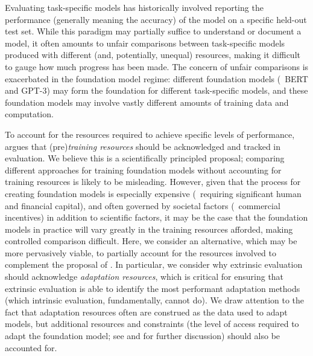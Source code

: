 Evaluating task-specific models has historically involved reporting the performance (generally meaning the accuracy) of the model on a specific held-out test set.
While this paradigm may partially suffice to understand or document a model, it often amounts to unfair comparisons between task-specific models produced with different (and, potentially, unequal) resources, making it difficult to gauge how much progress has been made.
The concern of unfair comparisons is exacerbated in the foundation model regime: different foundation models (\eg~BERT and GPT-3) may form the foundation for different task-specific models, and these foundation models may involve vastly different amounts of training data and computation.

To account for the resources required to achieve specific levels of performance, \citet{linzen2020} argues that (pre)\textit{training resources} should be acknowledged and tracked in evaluation. 
We believe this is a scientifically principled proposal; comparing different approaches for training foundation models without accounting for training resources is likely to be misleading.
However, given that the process for creating foundation models is especially expensive (\eg~requiring significant human and financial capital), and often governed by societal factors (\eg~commercial incentives) in addition to scientific factors, it may be the case that the foundation models in practice will vary greatly in the training resources afforded, making controlled comparison difficult.
Here, we consider an alternative, which may be more pervasively viable, to partially account for the resources involved to complement the proposal of \citet{linzen2020}.
In particular, we consider why extrinsic evaluation should acknowledge \textit{adaptation resources}, which is critical for ensuring that extrinsic evaluation is able to identify the most performant adaptation methods (which intrinsic evaluation, fundamentally, cannot do). 
We draw attention to the fact that adaptation resources often are construed as the data used to adapt models, but additional resources \citep[\eg data used to choose adaptation methods;][]{perez2021true} and constraints (\eg the level of access required to adapt the foundation model; see  and  for further discussion) should also be accounted for.

